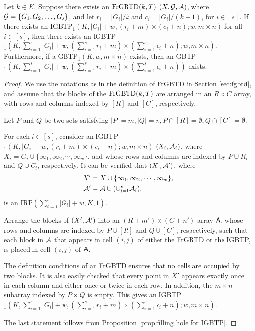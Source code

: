 \documentclass[draft, 11pt]{article}
\begin{document}
  \begin{proposition}
 \label{fgbtd+IGBTP} Let $k\in K$. Suppose there exists an ${\rm FrGBTD}(k,T)$
 $(X,\mathcal G,\mathcal A)$, where $\mathcal G=\{G_1,G_2,\ldots,G_s\}$, and let
 $r_i=|G_i|/k$ and $c_i=|G_i|/(k-1)$, for $i\in[s]$.
 If there exists an IGBTP$_1(K,|G_i|+w,(r_i+m)\times (c_i+n);w,m\times n)$ for all $i\in[s]$, then there exists
 an IGBTP$_1(K,\sum_{i=1}^s|G_i|+w,(\sum_{i=1}^sr_i+m)\times (\sum_{i=1}^sc_i+n);w,m\times
 n)$. Furthermore, if a GBTP$_1(K,w,m\times n)$ exists,
 then an GBTP$_1(K,\sum_{i=1}^s|G_i|+w,(\sum_{i=1}^sr_i+m)\times
 (\sum_{i=1}^sc_i+n))$ exists.
 \end{proposition}
 \begin{proof}
 We use the notations as in the definition of FrGBTD in Section
 \ref{sec:fgbtd}, and assume that the blocks of the ${\rm
 FrGBTD}(k,T)$ are arranged in an $R\times C$ array, with rows and
 columns indexed by $[R]$ and $[C]$, respectively.

 Let $P$ and $Q$ be two sets satisfying $|P|=m, |Q|=n, P\cap [R]=\emptyset, Q\cap
 [C]=\emptyset$.

 For each $i\in[s]$, consider an IGBTP$_1(K,|G_i|+w,(r_i+m)\times (c_i+n);w,m\times n)$
 $(X_i,\mathcal A_i)$, where $X_i=G_i\cup\{\infty_1,\infty_2,\cdots,
 \infty_w\}$, and whose rows and columns are indexed by $P\cup
 R_i$ and $Q\cup C_i$, respectively.
 It can be verified that
 $(X',\mathcal A')$, where
 \begin{align*}
 X' &= X \cup \{\infty_1,\infty_2,\cdots,\infty_w\}, \\
 \mathcal A' &= \mathcal A \cup ( \cup_{i=1}^s \mathcal A_i),
 \end{align*}
 is an IRP$(\sum_{i=1}^s|G_i|+w,K,1)$.

 Arrange the blocks of $(X',\mathcal A')$ into an
 $(R+m')\times(C+n')$ array ${\sf A}$, whose rows and columns are
 indexed by $P\cup [R]$ and $Q\cup [C]$, respectively, such that
 each block in $\mathcal A$ that appears in cell $(i,j)$ of either the FrGBTD or the IGBTP, is
 placed in cell $(i,j)$ of ${\sf A}$.

 The definition conditions of an FrGBTD ensures that no cells are
 occupied by two blocks. It is also easily checked that every point
 in $X'$ appears exactly once in each column and either once or twice
 in each row. In addition, the $m\times n$ subarray indexed by $P\times
 Q$ is empty. This gives an IGBTP$_1(K,\sum_{i=1}^s|G_i|+w,(\sum_{i=1}^sr_i+m)\times (\sum_{i=1}^sc_i+n);w,m\times
 n)$.

 The last statement follows from Proposition \ref{prop:filling hole for IGBTP}.
 \end{proof}
\end{document}
